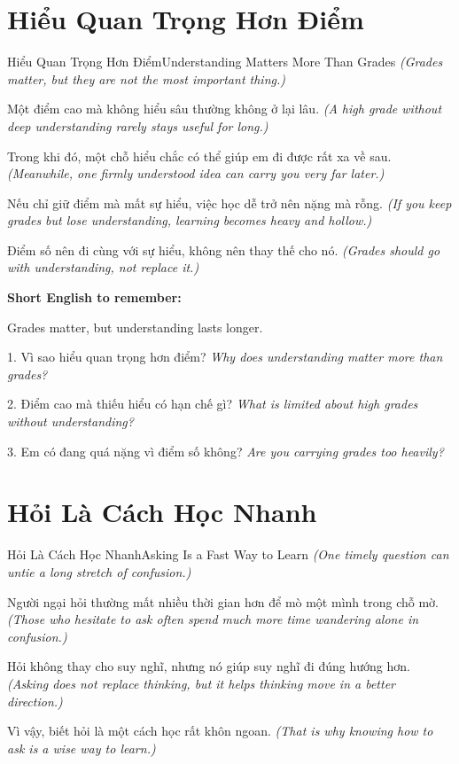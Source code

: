 \section{Hiểu Quan Trọng Hơn Điểm}
\begin{truyen}{Hiểu Quan Trọng Hơn Điểm}{Understanding Matters More Than Grades}
\textit{(Grades matter, but they are not the most important thing.)}

Một điểm cao mà không hiểu sâu thường không ở lại lâu.
\textit{(A high grade without deep understanding rarely stays useful for long.)}

Trong khi đó, một chỗ hiểu chắc có thể giúp em đi được rất xa về sau.
\textit{(Meanwhile, one firmly understood idea can carry you very far later.)}

Nếu chỉ giữ điểm mà mất sự hiểu, việc học dễ trở nên nặng mà rỗng.
\textit{(If you keep grades but lose understanding, learning becomes heavy and hollow.)}
\end{truyen}

\begin{baihoc}
Điểm số nên đi cùng với sự hiểu, không nên thay thế cho nó.
\textit{(Grades should go with understanding, not replace it.)}
\end{baihoc}

\begin{ghinhoanh}
\textbf{Short English to remember:}

Grades matter, but understanding lasts longer.

\end{ghinhoanh}

\begin{tuhocnhanh}
1. Vì sao hiểu quan trọng hơn điểm? \textit{Why does understanding matter more than grades?}

2. Điểm cao mà thiếu hiểu có hạn chế gì? \textit{What is limited about high grades without understanding?}

3. Em có đang quá nặng vì điểm số không? \textit{Are you carrying grades too heavily?}
\end{tuhocnhanh}
\ngancach

\section{Hỏi Là Cách Học Nhanh}
\begin{truyen}{Hỏi Là Cách Học Nhanh}{Asking Is a Fast Way to Learn}
\textit{(One timely question can untie a long stretch of confusion.)}

Người ngại hỏi thường mất nhiều thời gian hơn để mò một mình trong chỗ mờ.
\textit{(Those who hesitate to ask often spend much more time wandering alone in confusion.)}

Hỏi không thay cho suy nghĩ, nhưng nó giúp suy nghĩ đi đúng hướng hơn.
\textit{(Asking does not replace thinking, but it helps thinking move in a better direction.)}

Vì vậy, biết hỏi là một cách học rất khôn ngoan.
\textit{(That is why knowing how to ask is a wise way to learn.)}
\end{truyen}

